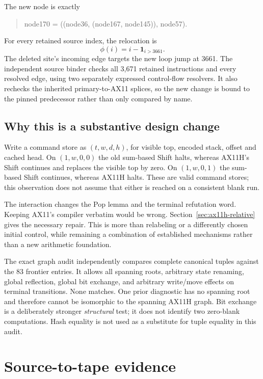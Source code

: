 \documentclass[11pt,a4paper]{article}
\begin{document}
The new node is exactly
\begin{quote}\small\ttfamily
node170 = ((node36, (node167, node145)), node57).
\end{quote}
For every retained source index, the relocation is
\[
 \phi(i)=i-\mathbf 1_{i>3661}.
\]
The deleted site's incoming edge targets the new loop jump at 3661.
The independent source binder checks all 3,671 retained instructions and
every resolved edge, using two separately expressed control-flow resolvers.
It also rechecks the inherited primary-to-AX11 splices, so the new change
is bound to the pinned predecessor rather than only compared by name.

\subsection{Why this is a substantive design change}

Write a command store as $(t,w,d,h)$, for visible top, encoded stack,
offset and cached head. On $(1,w,0,0)$ the old sum-based Shift halts,
whereas AX11H's Shift continues and replaces the visible top by zero.
On $(1,w,0,1)$ the sum-based Shift continues, whereas AX11H halts.
These are valid command stores; this observation does not assume that
either is reached on a consistent blank run.

The interaction changes the Pop lemma and the terminal refutation word.
Keeping AX11's compiler verbatim would be wrong. Section~\ref{sec:ax11h-relative}
gives the necessary repair. This is more than relabeling or a differently
chosen initial control, while remaining a combination of established
mechanisms rather than a new arithmetic foundation.

The exact graph audit independently compares complete canonical tuples
against the 83 frontier entries. It allows all spanning roots, arbitrary
state renaming, global reflection, global bit exchange, and arbitrary
write/move effects on terminal transitions. None matches. One prior
diagnostic has no spanning root and therefore cannot be isomorphic to
the spanning AX11H graph. Bit exchange is a deliberately stronger
\emph{structural} test; it does not identify two zero-blank computations.
Hash equality is not used as a substitute for tuple equality in this audit.



\section{Source-to-tape evidence}
\label{sec:physical}
\end{document}
